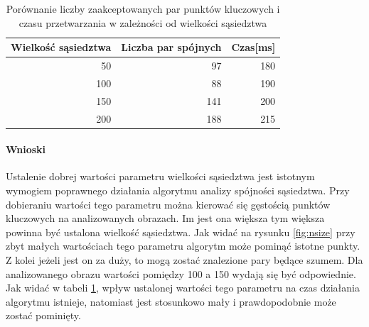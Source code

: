 \documentclass{article}
\begin{document}
	\begin{table}[H]
		\centering
		\caption{Porównanie liczby zaakceptowanych par punktów kluczowych i czasu przetwarzania w zależności od wielkości sąsiedztwa}
		\label{tab:nsize}
		\begin{tabular}{|r|r|r|}
			\hline
			\multicolumn{1}{|c|}{\textbf{Wielkość sąsiedztwa}} & \multicolumn{1}{c|}{\textbf{Liczba par spójnych}} & \multicolumn{1}{l|}{\textbf{Czas{[}ms{]}}} \\ \hline
			50                                                 & 97                                                & 180                                        \\ \hline
			100                                                & 88                                                & 190                                        \\ \hline
			150                                                & 141                                               & 200                                        \\ \hline
			200                                                & 188                                               & 215                                        \\ \hline
		\end{tabular}
	\end{table}

	\paragraph{Wnioski}
	Ustalenie dobrej wartości parametru wielkości sąsiedztwa jest istotnym wymogiem poprawnego działania algorytmu analizy spójności sąsiedztwa. Przy dobieraniu wartości tego parametru można kierować się gęstością punktów kluczowych na analizowanych obrazach. Im jest ona większa tym większa powinna być ustalona wielkość sąsiedztwa.
	Jak widać na rysunku \ref{fig:nsize} przy zbyt małych wartościach tego parametru algorytm może pominąć istotne punkty. Z kolei jeżeli jest on za duży, to mogą zostać znalezione pary będące szumem. Dla analizowanego obrazu wartości pomiędzy 100 a 150 wydają się być odpowiednie.\\
	Jak widać w tabeli \ref{tab:nsize}, wpływ ustalonej wartości tego parametru na czas działania algorytmu istnieje, natomiast jest stosunkowo mały i prawdopodobnie może zostać pominięty.
\end{document}
